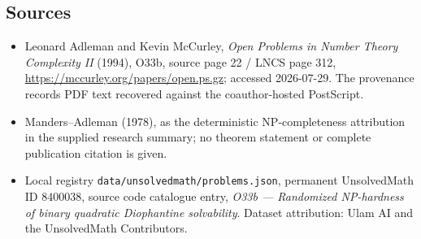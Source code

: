 \documentclass[11pt]{article}
\begin{document}
\subsection{Sources}
\begin{itemize}
\item Leonard Adleman and Kevin McCurley, \emph{Open Problems in Number Theory Complexity II} (1994), O33b, source page 22 / LNCS page 312, \url{https://mccurley.org/papers/open.ps.gz}; accessed 2026-07-29. The provenance records PDF text recovered against the coauthor-hosted PostScript.
\item Manders--Adleman (1978), as the deterministic NP-completeness attribution in the supplied research summary; no theorem statement or complete publication citation is given.
\item Local registry \texttt{data/unsolvedmath/problems.json}, permanent UnsolvedMath ID $8400038$, source code catalogue entry, \emph{O33b --- Randomized NP-hardness of binary quadratic Diophantine solvability}. Dataset attribution: Ulam AI and the UnsolvedMath Contributors.
\end{itemize}
\end{document}
